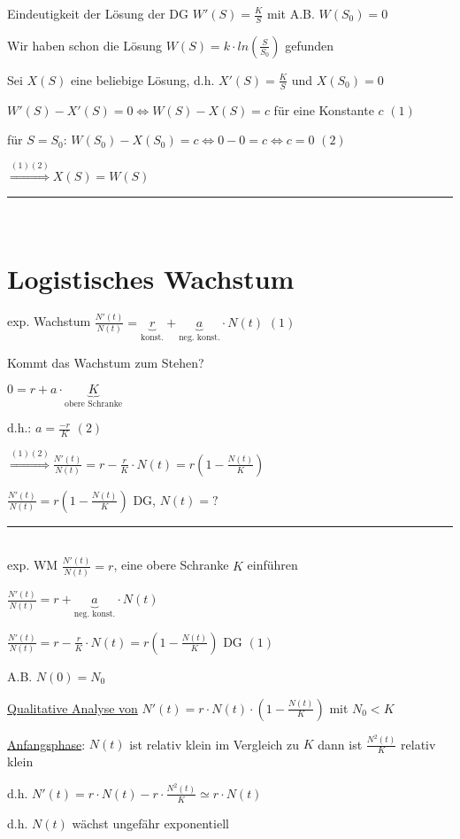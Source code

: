\documentclass[18pt,a4paper]{scrreprt}
\begin{document}
Eindeutigkeit der Lösung der DG $W'(S) = \frac{K}{S}$ mit A.B. $W(S_0)= 0$

Wir haben schon die Lösung $W(S)= k\cdot ln(\frac{S}{S_0})$ gefunden

Sei $X(S)$ eine beliebige Lösung, d.h. $X'(S)= \frac{K}{S}$ und $X(S_0) = 0$

$W'(S) - X'(S) = 0 \Leftrightarrow W(S) - X(S) = c$ für eine Konstante $c$ $(1)$

für $S = S_0$: $W(S_0) - X(S_0) = c \Leftrightarrow 0-0 = c \Leftrightarrow c =0$ $(2)$

$\stackrel{(1)(2)}{\Rightarrow} X(S) = W(S)$  
 
\rule{\textwidth}{0.4mm}\\

\section{Logistisches Wachstum}

exp. Wachstum $\frac{N'(t)}{N(t)} = \underbrace{r}_{\text{konst.}} + \underbrace{a}_{\text{neg. konst.}}\cdot N(t)$ $(1)$

Kommt das Wachstum zum Stehen?

$0 = r + a \cdot \underbrace{K}_{\text{obere Schranke}}$

d.h.: $a =\frac{-r}{K}$ $(2)$ 

$\stackrel{(1)(2)}{\Rightarrow} \frac{N'(t)}{N(t)} = r - \frac{r}{K} \cdot N(t) = r(1 - \frac{N(t)}{K})$

$\frac{N'(t)}{N(t)} = r(1 - \frac{N(t)}{K})$ DG, $N(t) = ?$

\rule{\textwidth}{0.4mm}\\

exp. WM $\frac{N'(t)}{N(t)} = r$, eine obere Schranke $K$ einführen

$\frac{N'(t)}{N(t)} = r + \underbrace{a}_{\text{neg. konst.}} \cdot N(t)$

$\frac{N'(t)}{N(t)} = r - \frac{r}{K} \cdot N(t) = r (1 - \frac{N(t)}{K})$ DG $(1)$

A.B. $N(0) = N_0$

\uline{Qualitative Analyse von} $N'(t) = r\cdot N(t) \cdot (1 - \frac{N(t)}{K})$ mit $N_0 < K$

\uline{Anfangsphase}: $N(t)$ ist relativ klein im Vergleich zu $K$ dann ist $\frac{N^2(t)}{K}$ relativ klein

d.h. $N'(t) = r \cdot N(t) - r \cdot \frac{N^2(t)}{K} \simeq r\cdot N(t)$

d.h. $N(t)$ wächst ungefähr exponentiell
\end{document}
